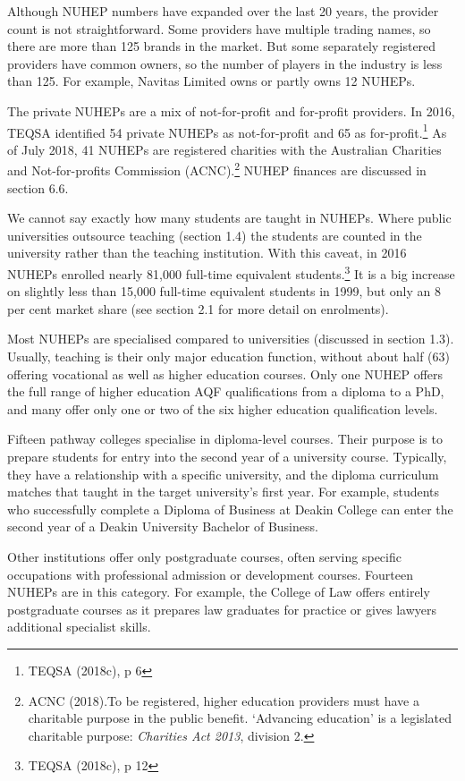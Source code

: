 \documentclass[]{book}
\begin{document}
Although NUHEP numbers have expanded over the last 20 years, the provider count is not straightforward. Some providers have multiple trading names, so there are more than 125 brands in the market. But some separately registered providers have common owners, so the number of players in the industry is less than 125. For example, Navitas Limited owns or partly owns 12 NUHEPs.

The private NUHEPs are a mix of not-for-profit and for-profit providers. In 2016, TEQSA identified 54 private NUHEPs as not-for-profit and 65 as for-profit.\footnote{TEQSA (2018c), p 6} As of July 2018, 41 NUHEPs are registered charities with the Australian Charities and Not-for-profits Commission (ACNC).\footnote{ACNC (2018).To be registered, higher education providers must have a charitable purpose in the public benefit. `Advancing education' is a legislated charitable purpose: \emph{Charities Act 2013}, division 2.} NUHEP finances are discussed in section 6.6.

We cannot say exactly how many students are taught in NUHEPs. Where public universities outsource teaching (section 1.4) the students are counted in the university rather than the teaching institution. With this caveat, in 2016 NUHEPs enrolled nearly 81,000 full-time equivalent students.\footnote{TEQSA (2018c), p 12} It is a big increase on slightly less than 15,000 full-time equivalent students in 1999, but only an 8 per cent market share (see section 2.1 for more detail on enrolments).

Most NUHEPs are specialised compared to universities (discussed in section 1.3). Usually, teaching is their only major education function, without about half (63) offering vocational as well as higher education courses. Only one NUHEP offers the full range of higher education AQF qualifications from a diploma to a PhD, and many offer only one or two of the six higher education qualification levels.

Fifteen pathway colleges specialise in diploma-level courses. Their purpose is to prepare students for entry into the second year of a university course. Typically, they have a relationship with a specific university, and the diploma curriculum matches that taught in the target university's first year. For example, students who successfully complete a Diploma of Business at Deakin College can enter the second year of a Deakin University Bachelor of Business.

Other institutions offer only postgraduate courses, often serving specific occupations with professional admission or development courses. Fourteen NUHEPs are in this category. For example, the College of Law offers entirely postgraduate courses as it prepares law graduates for practice or gives lawyers additional specialist skills.
\end{document}
